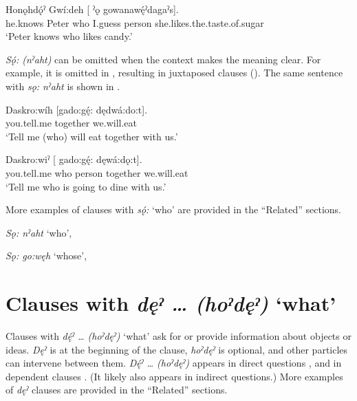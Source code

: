 \ea\label{ex:whoexsen}
\gll Honǫhdǫ́ˀ Gwí:deh [ ˀǫ   gowanawę́ˀdagaˀs]. \\
he.knows Peter who I.guess person she.likes.the.taste.of.sugar\\
\glt ‘Peter knows who likes candy.’ 
\z

\textit{Sǫ́: (nˀaht)} can be omitted when the context makes the meaning clear. For example, it is omitted in , resulting in juxtaposed clauses (). The same sentence with \textit{sǫ: nˀaht} is shown in .

\ea\label{ex:whoexsen3}
\gll Daskro:wíh [gado:gę́: dędwá:do:t]. \\
 you.tell.me together we.will.eat\\
\glt ‘Tell me (who) will eat together with us.’ 
\z

\ea\label{ex:whoexsen300}
\gll Daskro:wiˀ [   gado:gę́: dęwá:dǫ:t]. \\
 you.tell.me who person together we.will.eat\\
\glt ‘Tell me who is going to dine with us.’ 
\z

More examples of clauses with \textit{sǫ́:} ‘who’ are provided in the “Related” sections.

\begin{CayugaRelated}
\item{}\textit{Sǫ: nˀaht} ‘who’, 

\item{}\textit{Sǫ: go:węh} ‘whose’, 

\end{CayugaRelated}


\largerpage
\section{Clauses with \textit{dęˀ … (hoˀdęˀ)} ‘what’} \label{ch:Clauses with [dęˀ … (hoˀdęˀ)] ‘what’}
Clauses with \textit{dę́ˀ … (hoˀdęˀ)} ‘what’ ask for or provide information about objects or ideas. \textit{Dęˀ} is at the beginning of the clause, \textit{hoˀdęˀ} is optional, and other particles can intervene between them. \textit{Dę́ˀ … (hoˀdęˀ)} appears in direct questions , and in dependent clauses . (It likely also appears in indirect questions.) More examples of \textit{dęˀ} clauses are provided in the “Related” sections.

